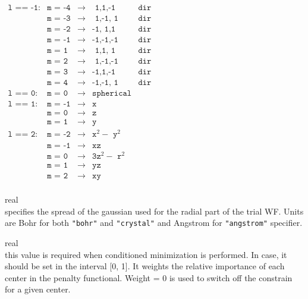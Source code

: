 {%
%
$\begin{array}{lllll}
\texttt{l == -1:}   &\texttt{m = -4}  &\rightarrow   & \texttt{ 1,1,-1}              &\texttt{dir}\\
\texttt{}           &\texttt{m = -3}  &\rightarrow   & \texttt{ 1,-1, 1}             &\texttt{dir}\\
\texttt{}           &\texttt{m = -2}  &\rightarrow   & \texttt{-1, 1,1}              &\texttt{dir}\\
\texttt{}           &\texttt{m = -1}  &\rightarrow   & \texttt{-1,-1,-1}             &\texttt{dir}\\
\texttt{}           &\texttt{m =  1}  &\rightarrow   & \texttt{ 1,1, 1}              &\texttt{dir}\\
\texttt{}           &\texttt{m =  2}  &\rightarrow   & \texttt{ 1,-1,-1}             &\texttt{dir}\\
\texttt{}           &\texttt{m =  3}  &\rightarrow   & \texttt{-1,1,-1}              &\texttt{dir}\\
\texttt{}           &\texttt{m =  4}  &\rightarrow   & \texttt{-1,-1, 1}             &\texttt{dir}\\
\texttt{l == 0:}    &\texttt{m =  0}  &\rightarrow   & \texttt{spherical}            &\texttt{}\\
\texttt{l == 1:}    &\texttt{m = -1}  &\rightarrow   & \texttt{x}                    &\texttt{}\\
\texttt{}           &\texttt{m =  0}  &\rightarrow   & \texttt{z}                    &\texttt{}\\
\texttt{}           &\texttt{m =  1}  &\rightarrow   & \texttt{y}                    &\texttt{}\\
\texttt{l == 2:}    &\texttt{m = -2}  &\rightarrow   & \texttt{x}^2 - \texttt{ y}^2  &\texttt{}\\
\texttt{}           &\texttt{m = -1}  &\rightarrow   & \texttt{xz}                   &\texttt{}\\
\texttt{}           &\texttt{m =  0}  &\rightarrow   & \texttt{3z}^2 - \texttt{ r}^2 &\texttt{}\\
\texttt{}           &\texttt{m =  1}  &\rightarrow   & \texttt{yz}                   &\texttt{}\\
\texttt{}           &\texttt{m =  2}  &\rightarrow   & \texttt{xy}                   &\texttt{}\\
\end{array}$ \par

\noindent{}%
{\sc real} \\ specifies the spread of the gaussian used for the radial part of the
trial WF. Units are Bohr for both {\tt"bohr"} and {\tt"crystal"} and Angstrom for {\tt "angstrom"} 
specifier.\par

\noindent{}%
{\sc real} \\ this value is required when conditioned minimization is performed. In case,
            it should be set in the interval [0, 1]. It weights the relative importance of
            each center in the penalty functional. Weight = 0 is used to switch off the
            constrain for a given center.\par
}
